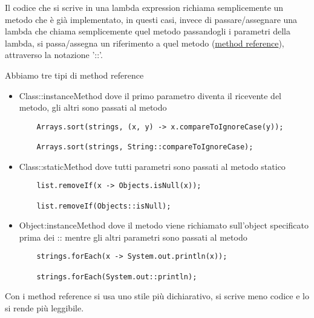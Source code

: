 Il codice che si scrive in una lambda expression richiama semplicemente un metodo che è già implementato, in questi casi, invece di passare/assegnare una lambda che 
chiama semplicemente quel metodo passandogli i parametri della lambda, si passa/assegna un riferimento a quel metodo (\underline{method reference}), attraverso la 
notazione '::'.
\smallskip

Abbiamo tre tipi di method reference
\begin{itemize}
    \item Class::instanceMethod dove il primo parametro diventa il ricevente del metodo, gli altri sono passati al metodo
    \begin{lstlisting}
    Arrays.sort(strings, (x, y) -> x.compareToIgnoreCase(y));

    Arrays.sort(strings, String::compareToIgnoreCase);
    \end{lstlisting}
    \item Class::staticMethod dove tutti parametri sono passati al metodo statico
    \begin{lstlisting}
    list.removeIf(x -> Objects.isNull(x));
    
    list.removeIf(Objects::isNull);
    \end{lstlisting}
    \item Object:instanceMethod dove il metodo viene richiamato sull’object specificato prima dei :: mentre gli altri parametri sono passati al metodo
    \begin{lstlisting}
    strings.forEach(x -> System.out.println(x));

    strings.forEach(System.out::println);
    \end{lstlisting}
\end{itemize}

Con i method reference si usa uno stile più dichiarativo, si scrive meno codice e lo si rende più leggibile.
